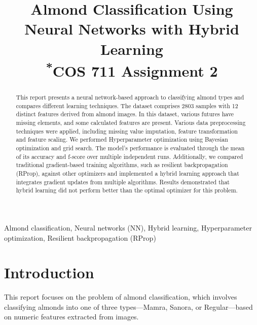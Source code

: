 \documentclass[conference]{IEEEtran}
\begin{document}
\title{Almond Classification Using Neural Networks with Hybrid Learning\\
{\footnotesize \textsuperscript{*}COS 711 Assignment 2}
}

\author{
}

\maketitle

\begin{abstract}
This report presents a neural network-based approach to classifying almond types and compares different learning techniques. The dataset comprises 2803 samples with 12 distinct features derived from almond images. In this dataset, various futures have missing elements, and some calculated features are present. Various data preprocessing techniques were applied, including missing value imputation, feature transformation and feature scaling. We performed Hyperparameter optimization using Bayesian optimization and grid search. The model's performance is evaluated through the mean of its accuracy and f-score over multiple independent runs. Additionally, we compared traditional gradient-based training algorithms, such as resilient backpropagation (RProp), against other optimizers and implemented a hybrid learning approach that integrates gradient updates from multiple algorithms. Results demonstrated that hybrid learning did not perform better than the optimal optimizer for this problem.
\end{abstract}

\begin{IEEEkeywords}
Almond classification, Neural networks (NN), Hybrid learning, Hyperparameter optimization, Resilient backpropagation (RProp)
\end{IEEEkeywords}

\section{Introduction}
This report focuses on the problem of almond classification, which involves classifying almonds into one of three types—Mamra, Sanora, or Regular—based on numeric features extracted from images.
\end{document}
